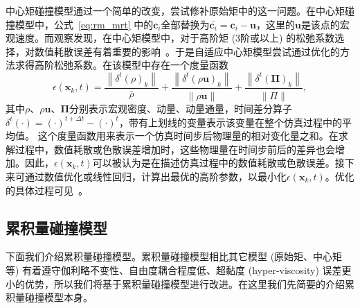 中心矩碰撞模型通过一个简单的改变，尝试修补原始矩中的这一问题。在中心矩碰撞模型中，公式~\ref{eq:rm_mrt} 中的$\boldsymbol{c}_{i}$全部替换为$\bar{\boldsymbol{c}_{i}}=\boldsymbol{c}_{i}-\boldsymbol{u}$，这里的$\boldsymbol{u}$是该点的宏观速度。而观察发现，在中心矩模型中，对于高阶矩 (3阶或以上) 的松弛系数选择，对数值耗散误差有着重要的影响~\cite{Li-2020}。于是自适应中心矩模型尝试通过优化的方法求得高阶松弛系数。在该模型中存在一个度量函数
\begin{equation}
    \epsilon\left(\mathbf{x}_k, t\right)=\frac{\left\|\delta^t(\rho)_k\right\|}{\bar{\rho}}+\frac{\left\|\delta^t(\rho \mathbf{u})_k\right\|}{\overline{\|\rho \mathbf{u}\|}}+\frac{\left\|\delta^t(\boldsymbol{\Pi})_k\right\|}{\overline{\|\Pi\|}},
\end{equation}
其中$\rho$、$\rho \mathbf{u}$、$\boldsymbol{\Pi}$分别表示宏观密度、动量、动量通量，时间差分算子$\delta^t(\cdot)=(\cdot)^{t+\Delta t}-(\cdot)^{t}$，带有上划线的变量表示该变量在整个仿真过程中的平均值。
这个度量函数用来表示一个仿真时间步后物理量的相对变化量之和。在求解过程中，数值耗散或色散误差增加时，这些物理量在时间步前后的差异也会增加。因此，$\epsilon(\mathbf{x}_k, t)$可以被认为是在描述仿真过程中的数值耗散或色散误差。接下来可通过数值优化或线性回归，计算出最优的高阶参数，以最小化$\epsilon\left(\mathbf{x}_k, t\right)$。优化的具体过程可见~\cite{Li-2020}。

\subsection{累积量碰撞模型}
\label{sec:cumulant}
下面我们介绍累积量碰撞模型。累积量碰撞模型相比其它模型 (原始矩、中心矩等) 有着遵守伽利略不变性、自由度耦合程度低、超黏度 (hyper-viscosity) 误差更小的优势，所以我们将基于累积量碰撞模型进行改进。在这里我们先简要的介绍累积量碰撞模型本身。

